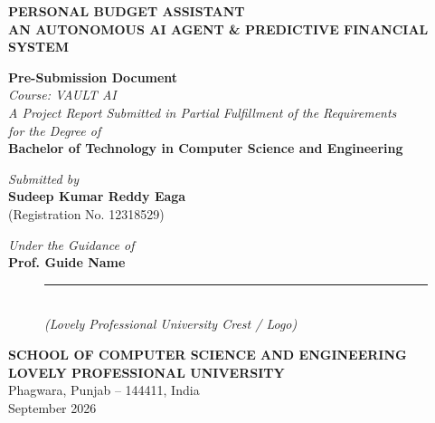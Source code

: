 \documentclass[12pt,a4paper,oneside]{report}
\newcommand*{\name}{Sudeep Kumar Reddy Eaga}
\newcommand*{\id}{12318529}
\newcommand*{\course}{VAULT AI}
\newcommand*{\assignment}{Pre-Submission Document}
\begin{document}

\begin{titlepage}
    \begin{center}
        \vspace*{0.5cm}
        
        \Huge \textbf{PERSONAL BUDGET ASSISTANT} \\[0.4cm]
        \Large \textbf{AN AUTONOMOUS AI AGENT \& PREDICTIVE FINANCIAL SYSTEM}
        
        \vspace{1.2cm}
        
        \large \textbf{\assignment} \\[0.3cm]
        \large \textit{Course: \course} \\[0.3cm]
        \large \textit{A Project Report Submitted in Partial Fulfillment of the Requirements \\ for the Degree of} \\[0.3cm]
        \Large \textbf{Bachelor of Technology in Computer Science and Engineering}
        
        \vspace{1.2cm}
        
        \large \textit{Submitted by} \\[0.2cm]
        \Large \textbf{\name} \\
        \large (Registration No. \id)
        
        \vspace{1.2cm}
        
        \large \textit{Under the Guidance of} \\[0.2cm]
        \Large \textbf{Prof. Guide Name}
        
        \vspace{1.2cm}
        
        \begin{figure}[h!]
            \centering
            \rule{3.5cm}{3.5cm} \\
            \vspace{0.2cm}
            \small \textit{(Lovely Professional University Crest / Logo)}
        \end{figure}
        
        \vspace{0.6cm}
        
        \Large \textbf{SCHOOL OF COMPUTER SCIENCE AND ENGINEERING} \\[0.2cm]
        \large \textbf{LOVELY PROFESSIONAL UNIVERSITY} \\[0.2cm]
        \large Phagwara, Punjab -- 144411, India \\[0.4cm]
        \large September 2026
    \end{center}
\end{titlepage}
\end{document}

